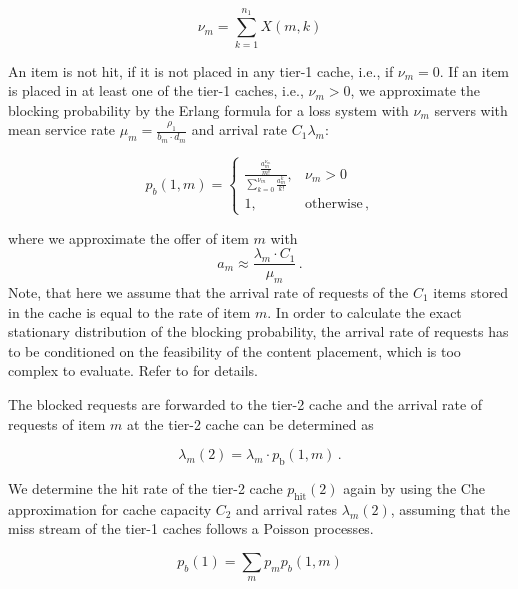 \begin{equation}
\nu_m=\sum_{k=1}^{n_1} X(m,k)
\end{equation}

An item is not hit, if it is not placed in any tier-1 cache, i.e., if $\nu_m=0$.
If an item is placed in at least one of the tier-1 caches, i.e., $\nu_m>0$, we approximate the blocking probability by the Erlang formula for a loss system with $\nu_m$ servers with mean service rate $\mu_{m} = \frac{\rho_1}{b_m\cdot d_m}$ and arrival rate $C_1\lambda_m$:


\begin{equation}
p_{b}(1,m) =
	\begin{cases}
		\frac{\frac{a_m^{\nu_m}}{m!}}{\sum_{k=0}^{\nu_m}\frac{a_m^k}{k!}}, & \nu_m>0 \\
    1, & \text{otherwise} \, ,
	\end{cases}
\end{equation}

where we approximate the offer of item $m$ with
\begin{equation}
a_m \approx \frac{\lambda_m\cdot C_1}{\mu_m} \, .
\end{equation}
Note, that here we assume that the arrival rate of requests of the $C_1$ items stored in the cache is equal to the rate of item $m$.
In order to calculate the exact stationary distribution of the blocking probability, the arrival rate of requests has to be conditioned on the feasibility of the content placement, which is too complex to evaluate.
Refer to \cite{tan2013optimal} for details.

The blocked requests are forwarded to the tier-2 cache and the arrival rate of requests of item $m$ at the tier-2 cache can be determined as

\begin{equation}
	\lambda_m(2) = \lambda_m\cdot p_\text{b}(1,m) \, .
\end{equation}

We determine the hit rate of the tier-2 cache $p_\text{hit}(2)$ again by using the Che approximation for cache capacity $C_2$ and arrival rates $\lambda_m(2)$, assuming that the miss stream of the tier-1 caches follows a Poisson processes.

\begin{equation}
	p_b(1) = \sum_m p_m p_{b}(1,m)
\end{equation}


